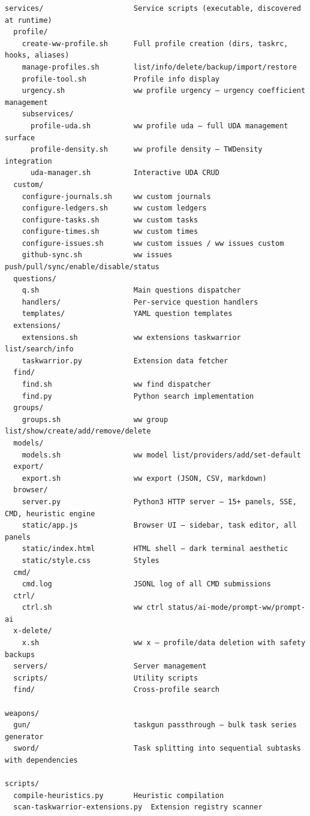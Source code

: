 \documentclass[
]{article}
\begin{document}
\begin{verbatim}
services/                     Service scripts (executable, discovered at runtime)
  profile/
    create-ww-profile.sh      Full profile creation (dirs, taskrc, hooks, aliases)
    manage-profiles.sh        list/info/delete/backup/import/restore
    profile-tool.sh           Profile info display
    urgency.sh                ww profile urgency — urgency coefficient management
    subservices/
      profile-uda.sh          ww profile uda — full UDA management surface
      profile-density.sh      ww profile density — TWDensity integration
      uda-manager.sh          Interactive UDA CRUD
  custom/
    configure-journals.sh     ww custom journals
    configure-ledgers.sh      ww custom ledgers
    configure-tasks.sh        ww custom tasks
    configure-times.sh        ww custom times
    configure-issues.sh       ww custom issues / ww issues custom
    github-sync.sh            ww issues push/pull/sync/enable/disable/status
  questions/
    q.sh                      Main questions dispatcher
    handlers/                 Per-service question handlers
    templates/                YAML question templates
  extensions/
    extensions.sh             ww extensions taskwarrior list/search/info
    taskwarrior.py            Extension data fetcher
  find/
    find.sh                   ww find dispatcher
    find.py                   Python search implementation
  groups/
    groups.sh                 ww group list/show/create/add/remove/delete
  models/
    models.sh                 ww model list/providers/add/set-default
  export/
    export.sh                 ww export (JSON, CSV, markdown)
  browser/
    server.py                 Python3 HTTP server — 15+ panels, SSE, CMD, heuristic engine
    static/app.js             Browser UI — sidebar, task editor, all panels
    static/index.html         HTML shell — dark terminal aesthetic
    static/style.css          Styles
  cmd/
    cmd.log                   JSONL log of all CMD submissions
  ctrl/
    ctrl.sh                   ww ctrl status/ai-mode/prompt-ww/prompt-ai
  x-delete/
    x.sh                      ww x — profile/data deletion with safety backups
  servers/                    Server management
  scripts/                    Utility scripts
  find/                       Cross-profile search

weapons/
  gun/                        taskgun passthrough — bulk task series generator
  sword/                      Task splitting into sequential subtasks with dependencies

scripts/
  compile-heuristics.py       Heuristic compilation
  scan-taskwarrior-extensions.py  Extension registry scanner


\end{verbatim}
\end{document}
